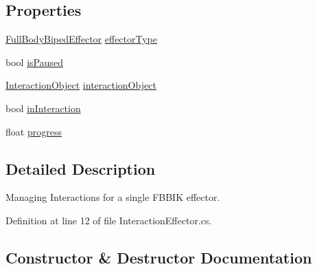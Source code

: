 \subsection*{Properties}
\begin{DoxyCompactItemize}
\item 
\mbox{\hyperlink{namespace_root_motion_1_1_final_i_k_ae0dd2058c7667b6f132c11a6b860c14a}{Full\+Body\+Biped\+Effector}} \mbox{\hyperlink{class_root_motion_1_1_final_i_k_1_1_interaction_effector_a7c98593a91ed1e12f940f3ab1a5e9c9c}{effector\+Type}}
\item 
bool \mbox{\hyperlink{class_root_motion_1_1_final_i_k_1_1_interaction_effector_a516fb9d7d9b3990a66fa7ae000398554}{is\+Paused}}
\item 
\mbox{\hyperlink{class_root_motion_1_1_final_i_k_1_1_interaction_object}{Interaction\+Object}} \mbox{\hyperlink{class_root_motion_1_1_final_i_k_1_1_interaction_effector_a5c48995c4290262ffcde75ff24dbd84d}{interaction\+Object}}
\item 
bool \mbox{\hyperlink{class_root_motion_1_1_final_i_k_1_1_interaction_effector_a4b35edd367b5661a541bc7c0c081cd2e}{in\+Interaction}}
\item 
float \mbox{\hyperlink{class_root_motion_1_1_final_i_k_1_1_interaction_effector_ac3901437a7c632c045991eba167c2dc7}{progress}}
\end{DoxyCompactItemize}


\subsection{Detailed Description}
Managing Interactions for a single F\+B\+B\+IK effector. 



Definition at line 12 of file Interaction\+Effector.\+cs.



\subsection{Constructor \& Destructor Documentation}
\mbox{\label{class_root_motion_1_1_final_i_k_1_1_interaction_effector_ab3dd1265142860d8ec5db881b8a34aa8}} 
